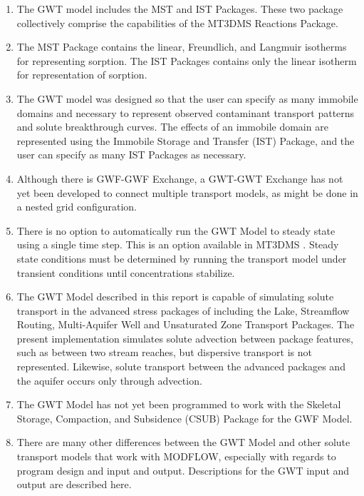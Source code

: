 \begin{enumerate}
\item The GWT model includes the MST and IST Packages.  These two package collectively comprise the capabilities of the MT3DMS Reactions Package.

\item The MST Package contains the linear, Freundlich, and Langmuir isotherms for representing sorption.  The IST Packages contains only the linear isotherm for representation of sorption. 

\item The GWT model was designed so that the user can specify as many immobile domains and necessary to represent observed contaminant transport patterns and solute breakthrough curves.  The effects of an immobile domain are represented using the Immobile Storage and Transfer (IST) Package, and the user can specify as many IST Packages as necessary.  

\item Although there is GWF-GWF Exchange, a GWT-GWT Exchange has not yet been developed to connect multiple transport models, as might be done in a nested grid configuration.  

\item There is no option to automatically run the GWT Model to steady state using a single time step.  This is an option available in MT3DMS \citep{zheng2010supplemental}.  Steady state conditions must be determined by running the transport model under transient conditions until concentrations stabilize.

\item The GWT Model described in this report is capable of simulating solute transport in the advanced stress packages of \mfcomma including the Lake, Streamflow Routing, Multi-Aquifer Well and Unsaturated Zone Transport Packages.  The present implementation simulates solute advection between package features, such as between two stream reaches, but dispersive transport is not represented.  Likewise, solute transport between the advanced packages and the aquifer occurs only through advection.

\item The GWT Model has not yet been programmed to work with the Skeletal Storage, Compaction, and Subsidence (CSUB) Package for the GWF Model.  

\item There are many other differences between the \mf GWT Model and other solute transport models that work with MODFLOW, especially with regards to program design and input and output.  Descriptions for the GWT input and output are described here.

\end{enumerate}

